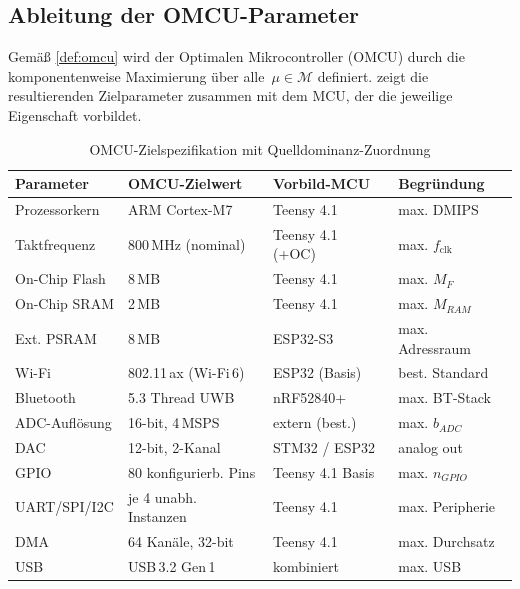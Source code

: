 ﻿\documentclass[12pt, a4paper]{article}
\theoremstyle{plain}
\theoremstyle{definition}
\theoremstyle{remark}
\newcommand{\omcu}{\textsc{OMCU}}
\begin{document}
\subsection{Ableitung der OMCU-Parameter}

Gemäß \cref{def:omcu} wird der Optimalen Mikrocontroller (\omcu{}) durch die komponentenweise
Maximierung über alle~$\mu \in \mathcal{M}$ definiert.
 zeigt die resultierenden Zielparameter
zusammen mit dem MCU, der die jeweilige Eigenschaft vorbildet.

\begin{table}[H]
  \centering
  \caption{OMCU-Zielspezifikation mit Quelldominanz-Zuordnung}
  \label{tab:omcu_params}
  \begin{tabular}{llll}
    \toprule
    \textbf{Parameter} & \textbf{OMCU-Zielwert} & \textbf{Vorbild-MCU} & \textbf{Begründung}\\
    \midrule
    Prozessorkern          & ARM Cortex-M7 & Teensy 4.1       & max. DMIPS \\
    Taktfrequenz           & 800\,MHz (nominal)       & Teensy 4.1 (+OC) & max. $f_\text{clk}$\\
    On-Chip Flash          & 8\,MB                    & Teensy 4.1       & max. $M_F$ \\
    On-Chip SRAM           & 2\,MB                    & Teensy 4.1       & max. $M_{RAM}$ \\
    Ext. PSRAM             & 8\,MB                    & ESP32-S3         & max. Adressraum\\
    Wi-Fi                  & 802.11\,ax (Wi-Fi\,6)    & ESP32 (Basis)    & best. Standard \\
    Bluetooth              & 5.3 Thread UWB       & nRF52840+        & max. BT-Stack \\
    ADC-Auflösung          & 16-bit, 4\,MSPS          & extern (best.)   & max. $b_{ADC}$\\
    DAC                    & 12-bit, 2-Kanal           & STM32 / ESP32    & analog out \\
    GPIO                   & 80 konfigurierb. Pins    & Teensy 4.1 Basis & max. $n_{GPIO}$\\
    UART/SPI/I2C           & je 4 unabh. Instanzen    & Teensy 4.1       & max. Peripherie \\
    DMA                    & 64 Kanäle, 32-bit         & Teensy 4.1       & max. Durchsatz \\
    USB                    & USB\,3.2 Gen\,1   & kombiniert       & max. USB\\

\end{tabular}
\end{table}
\end{document}
